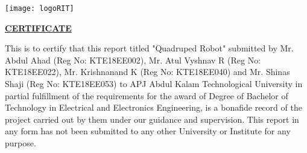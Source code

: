 \begin{center}
    \begin{center}   
        \texttt{[image: logoRIT]}
    \end{center}
\vspace{0.5cm}
    
\vspace{2 cm}

\textbf{\underline{CERTIFICATE}}\\
\vspace{0.5cm}
\end{center}

This is to certify that this report titled "Quadruped Robot" submitted by Mr. Abdul Ahad (Reg No: KTE18EE002), Mr. Atul Vyshnav R (Reg No: KTE18EE022), Mr. Krishnanand K (Reg No: KTE18EE040) and Mr. Shinas Shaji (Reg No: KTE18EE053) to APJ Abdul Kalam Technological University in partial fulfillment of the requirements for the award of Degree of Bachelor of Technology in Electrical and Electronics Engineering, is a bonafide record of the project carried out by them under our guidance and supervision. This report in any form has not been submitted to any other University or Institute for any purpose. 